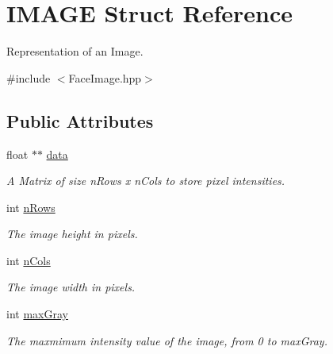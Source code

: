 \hypertarget{struct_i_m_a_g_e}{}\section{I\+M\+A\+GE Struct Reference}
\label{struct_i_m_a_g_e}


Representation of an Image.  




{\ttfamily \#include $<$Face\+Image.\+hpp$>$}

\subsection*{Public Attributes}
\begin{DoxyCompactItemize}
\item 
\hypertarget{struct_i_m_a_g_e_a9f5ca38398c7abac902363eef2a272ae}{}\label{struct_i_m_a_g_e_a9f5ca38398c7abac902363eef2a272ae} 
float $\ast$$\ast$ \hyperlink{struct_i_m_a_g_e_a9f5ca38398c7abac902363eef2a272ae}{data}
\begin{DoxyCompactList}\small\item\em A Matrix of size n\+Rows x n\+Cols to store pixel intensities. \end{DoxyCompactList}\item 
\hypertarget{struct_i_m_a_g_e_a8900cd7c9d4ae38d6b05a7652438bf94}{}\label{struct_i_m_a_g_e_a8900cd7c9d4ae38d6b05a7652438bf94} 
int \hyperlink{struct_i_m_a_g_e_a8900cd7c9d4ae38d6b05a7652438bf94}{n\+Rows}
\begin{DoxyCompactList}\small\item\em The image height in pixels. \end{DoxyCompactList}\item 
\hypertarget{struct_i_m_a_g_e_a9d6a20ddfa0dbc3c49c175914a9bd1cb}{}\label{struct_i_m_a_g_e_a9d6a20ddfa0dbc3c49c175914a9bd1cb} 
int \hyperlink{struct_i_m_a_g_e_a9d6a20ddfa0dbc3c49c175914a9bd1cb}{n\+Cols}
\begin{DoxyCompactList}\small\item\em The image width in pixels. \end{DoxyCompactList}\item 
\hypertarget{struct_i_m_a_g_e_a27f9e858cb588d9df5b0d608299d8ade}{}\label{struct_i_m_a_g_e_a27f9e858cb588d9df5b0d608299d8ade} 
int \hyperlink{struct_i_m_a_g_e_a27f9e858cb588d9df5b0d608299d8ade}{max\+Gray}
\begin{DoxyCompactList}\small\item\em The maxmimum intensity value of the image, from 0 to max\+Gray. \end{DoxyCompactList}\end{DoxyCompactItemize}


